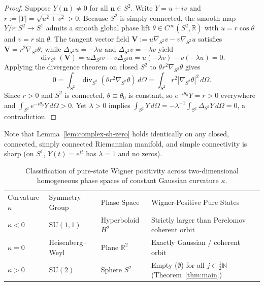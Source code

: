 \documentclass[aps,prl,reprint,amsmath,amssymb,nofootinbib,floatfix]{revtex4-2}
\newcommand{\divS}{\operatorname{div}_{S^2}}
\newcommand{\gradS}{\nabla_{S^2}}
\newcommand{\LapS}{\Delta_{S^2}}
\newcommand{\bn}{\mathbf{n}}
\begin{document}
\begin{proof}
Suppose $Y(\bn) \neq 0$ for all $\bn \in S^2$. Write $Y = u + iv$ and $r := |Y| = \sqrt{u^2 + v^2} > 0$. Because $S^2$ is simply connected, the smooth map $Y/r : S^2 \to S^1$ admits a smooth global phase lift $\theta \in C^\infty(S^2, \mathbb{R})$ with $u = r\cos\theta$ and $v = r\sin\theta$. The tangent vector field $\mathbf{V} := u\gradS v - v\gradS u$ satisfies $\mathbf{V} = r^2\gradS\theta$, while $\LapS u = -\lambda u$ and $\LapS v = -\lambda v$ yield
\begin{equation}
\divS(\mathbf{V}) = u\LapS v - v\LapS u = u(-\lambda v) - v(-\lambda u) = 0.
\end{equation}
Applying the divergence theorem on closed $S^2$ to $\theta r^2\gradS\theta$ gives
\begin{equation}
0 = \int_{S^2} \divS(\theta r^2\gradS\theta)\,d\Omega = \int_{S^2} r^2 |\gradS\theta|^2\,d\Omega.
\end{equation}
Since $r > 0$ and $S^2$ is connected, $\theta \equiv \theta_0$ is constant, so $e^{-i\theta_0}Y = r > 0$ everywhere and $\int_{S^2} e^{-i\theta_0}Y\,d\Omega > 0$. Yet $\lambda > 0$ implies $\int_{S^2} Y\,d\Omega = -\lambda^{-1}\int_{S^2}\LapS Y\,d\Omega = 0$, a contradiction.
\end{proof}

Note that Lemma~\ref{lem:complex-sh-zero} holds identically on any closed, connected, simply connected Riemannian manifold, and simple connectivity is sharp (on $S^1$, $Y(t) = e^{it}$ has $\lambda = 1$ and no zeros).

\begin{table}[t]
\caption{\label{tab:trichotomy}Classification of pure-state Wigner positivity across two-dimensional homogeneous phase spaces of constant Gaussian curvature $\kappa$.}
\begin{ruledtabular}
\begin{tabular}{llll}
Curvature $\kappa$ & Symmetry Group & Phase Space & Wigner-Positive Pure States \\
\colrule
$\kappa < 0$ & $\mathrm{SU}(1,1)$ & Hyperboloid $H^2$ & Strictly larger than Perelomov coherent orbit~\cite{Klimov2026,Kam2026} \\
$\kappa = 0$ & Heisenberg--Weyl & Plane $\mathbb{R}^2$ & Exactly Gaussian / coherent orbit~\cite{Hudson1974} \\
$\kappa > 0$ & $\mathrm{SU}(2)$ & Sphere $S^2$ & Empty ($\emptyset$) for all $j \in \frac{1}{2}\mathbb{N}$ (Theorem~\ref{thm:main}) \\
\end{tabular}
\end{ruledtabular}
\end{table}
\end{document}
